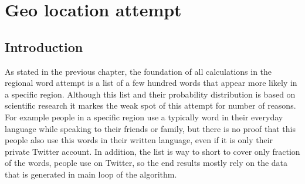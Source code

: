 \documentclass[../Main.tex]{subfiles}
\begin{document}
\section{Geo location attempt }
\subsection{Introduction}
As stated in the previous chapter, the foundation of all calculations in the regional word attempt is a list of a few hundred words that appear more likely in a specific region. 
Although this list and their probability distribution is based on scientific research it markes the weak spot of this attempt for number of reasons. For example people in a specific region use a typically word in their everyday language while speaking to their friends or family, but there is no proof that this people also use this words in their written language, even if it is only their private Twitter account. In addition, the list is way to short to cover only fraction of the words, people use on Twitter, so the end results mostly rely on the data that is generated in main loop of the algorithm.
\end{document}
